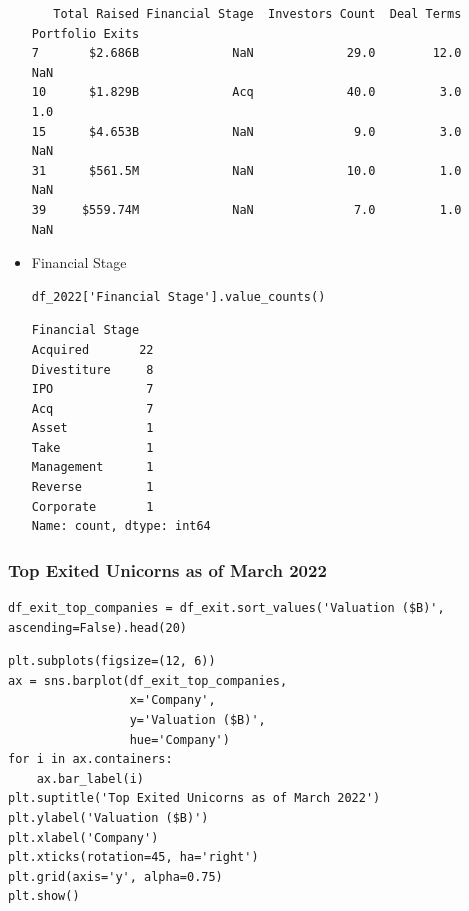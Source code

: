 \documentclass[a4paper,12pt]{article}
\begin{document}
\begin{itemize}
\begin{verbatim}
   Total Raised Financial Stage  Investors Count  Deal Terms  Portfolio Exits
7       $2.686B             NaN             29.0        12.0              NaN
10      $1.829B             Acq             40.0         3.0              1.0
15      $4.653B             NaN              9.0         3.0              NaN
31      $561.5M             NaN             10.0         1.0              NaN
39     $559.74M             NaN              7.0         1.0              NaN
\end{verbatim}

\item Financial Stage

\begin{verbatim}
df_2022['Financial Stage'].value_counts()
\end{verbatim}

\label{}
\begin{verbatim}
Financial Stage
Acquired       22
Divestiture     8
IPO             7
Acq             7
Asset           1
Take            1
Management      1
Reverse         1
Corporate       1
Name: count, dtype: int64
\end{verbatim}
\end{itemize}
\subsubsection{Top Exited Unicorns as of March 2022}
\label{sec:orgb8999ae}

\begin{verbatim}
df_exit_top_companies = df_exit.sort_values('Valuation ($B)', ascending=False).head(20)
\end{verbatim}

\begin{verbatim}
plt.subplots(figsize=(12, 6))
ax = sns.barplot(df_exit_top_companies,
                 x='Company',
                 y='Valuation ($B)',
                 hue='Company')
for i in ax.containers:
    ax.bar_label(i)
plt.suptitle('Top Exited Unicorns as of March 2022')
plt.ylabel('Valuation ($B)')
plt.xlabel('Company')
plt.xticks(rotation=45, ha='right')
plt.grid(axis='y', alpha=0.75)
plt.show()
\end{verbatim}
\end{document}
